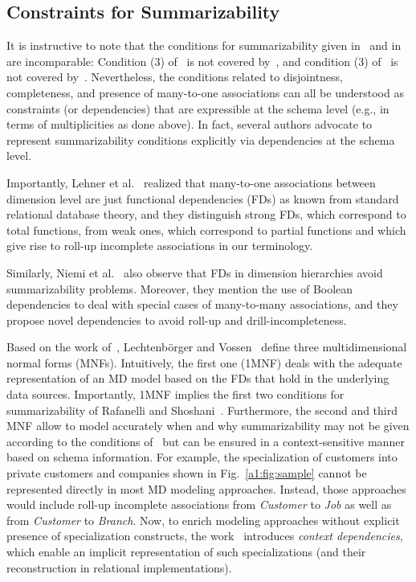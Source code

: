 \subsection{Constraints for Summarizability}
\label{a1:sec:dependencies}

It is instructive to note that the conditions for summarizability
given in~\cite{DBLP:conf/ssdbm/RafanelliS90} and
in~\cite{DBLP:conf/ssdbm/LenzS97} are incomparable: Condition (3)
of~\cite{DBLP:conf/ssdbm/RafanelliS90} is not covered
by~\cite{DBLP:conf/ssdbm/LenzS97}, and condition (3)
of~\cite{DBLP:conf/ssdbm/LenzS97} is not covered
by~\cite{DBLP:conf/ssdbm/RafanelliS90}.  Nevertheless, the
conditions related to disjointness, completeness, and presence of
many-to-one associations can all be understood as constraints (or
dependencies) that are expressible at the schema level (e.g., in
terms of multiplicities as done above).  In fact, several authors
advocate to represent summarizability conditions explicitly via
dependencies at the schema level.

Importantly, Lehner et al.~\cite{DBLP:conf/ssdbm/LehnerAW98}
realized that many-to-one associations between dimension level are
just functional dependencies (FDs) as known from standard relational
database theory, and they distinguish strong FDs, which correspond
to total functions, from weak ones, which correspond to partial
functions and which give rise to roll-up incomplete associations in
our terminology.

Similarly, Niemi et
al.~\cite{DBLP:conf/dmdw/NiemiNT01,DBLP:journals/dke/NiemiNT03} also
observe that FDs in dimension hierarchies avoid summarizability
problems. Moreover, they mention the use of Boolean dependencies to
deal with special cases of many-to-many associations, and they
propose novel dependencies to avoid roll-up and
drill-incompleteness.

Based on the work of~\cite{DBLP:conf/ssdbm/LehnerAW98},
Lechtenb{\"o}rger and
Vo\-ssen~\cite{DBLP:journals/is/LechtenborgerV03} define three
multidimensional normal forms (MNFs).  Intuitively, the first one
(1MNF) deals with the adequate representation of an MD model based
on the FDs that hold in the underlying data sources.  Importantly,
1MNF implies the first two conditions for summarizability of
Rafanelli and Shoshani~\cite{DBLP:conf/ssdbm/RafanelliS90}.
Furthermore, the second and third MNF allow to model accurately when
and why summarizability may not be given according to the conditions
of~\cite{DBLP:conf/ssdbm/LenzS97,DBLP:conf/ssdbm/RafanelliS90} but
can be ensured in a context-sensitive manner based on schema
information.  For example, the specialization of customers into
private customers and companies shown in Fig.~\ref{a1:fig:sample}
cannot be represented directly in most MD modeling approaches.
Instead, those approaches would include roll-up incomplete
associations from \textit{Customer} to \textit{Job} as well as from
\textit{Customer} to \textit{Branch}.  Now, to enrich modeling
approaches without explicit presence of specialization constructs,
the work~\cite{DBLP:journals/is/LechtenborgerV03} introduces
\emph{context dependencies}, which enable an implicit representation
of such specializations (and their reconstruction in relational
implementations).

